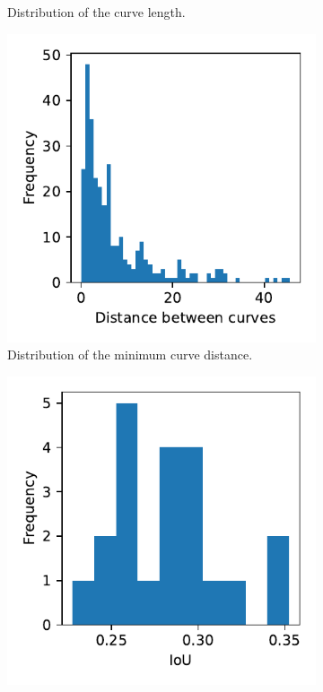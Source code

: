 \begin{figure}[h]
\begin{subfigure}{.3\textwidth}
        \caption{Distribution of the curve length.}
        \label{fig:example.metric.distributions.curve_length}
    \end{subfigure}
    \begin{subfigure}{.3\textwidth}
        \includegraphics[width=\textwidth]{graphics/eval/min_dist.pdf}
        \caption{Distribution of the minimum curve distance.}
        \label{fig:example.metric.distributions.min_dist}
    \end{subfigure}
    \begin{subfigure}{.3\textwidth}
        \includegraphics[width=\textwidth]{graphics/eval/raster_dist.pdf}

\end{subfigure}
\end{figure}
